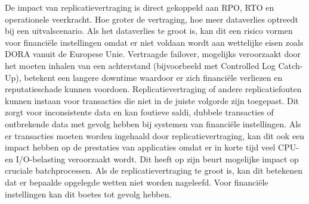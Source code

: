 De impact van replicatievertraging is direct gekoppeld aan RPO, RTO en operationele veerkracht.
Hoe groter de vertraging, hoe meer dataverlies optreedt bij een uitvalscenario.
Als het dataverlies te groot is, kan dit een risico vormen voor financiële instellingen omdat er niet voldaan wordt aan wettelijke eisen zoals DORA vanuit de Europese Unie.
Vertraagde failover, mogelijks veroorzaakt door het moeten inhalen van een achterstand (bijvoorbeeld met Controlled Log Catch-Up), betekent een langere downtime waardoor er zich financiële verliezen en reputatieschade kunnen voordoen.
Replicatievertraging of andere replicatiefouten kunnen instaan voor transacties die niet in de juiste volgorde zijn toegepast. 
Dit zorgt voor inconsistente data en kan foutieve saldi, dubbele transacties of ontbrekende data met gevolg hebben bij systemen van financiële instellingen.
Als er transacties moeten worden ingehaald door replicatievertraging, kan dit ook een impact hebben op de prestaties van applicaties omdat er in korte tijd veel CPU- en I/O-belasting veroorzaakt wordt.
Dit heeft op zijn beurt mogelijke impact op cruciale batchprocessen.
Als de replicatievertraging te groot is, kan dit betekenen dat er bepaalde opgelegde wetten niet worden nageleefd.
Voor financiële instellingen kan dit boetes tot gevolg hebben.

\subsubsection{}
\label{sec:asynchrone-log-replicatie-mitigatiestrategie-replicatievertraging}

